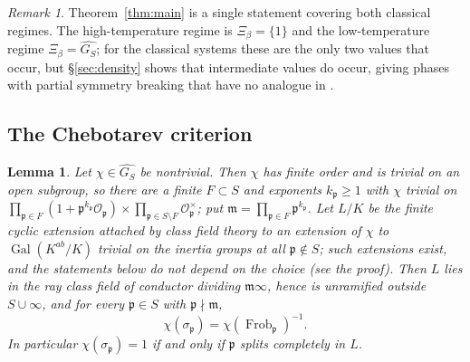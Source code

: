 \documentclass[11pt]{amsart}
\numberwithin{equation}{section}
\newtheorem{lemma}[theorem]{Lemma}
\theoremstyle{definition}
\theoremstyle{remark}
\newtheorem{remark}[theorem]{Remark}
\newcommand{\Gal}{\operatorname{Gal}}
\newcommand{\Frob}{\operatorname{Frob}}
\newcommand{\cO}{\mathcal{O}}
\newcommand{\pp}{\mathfrak{p}}
\newcommand{\mm}{\mathfrak{m}}
\begin{document}
\begin{remark}
Theorem~\ref{thm:main} is a single statement covering both classical regimes.
The high-temperature regime is $\Xi_\beta=\{1\}$ and the low-temperature regime
$\Xi_\beta=\widehat{G_S}$; for the classical systems these are the only two
values that occur, but \S\ref{sec:density} shows that intermediate values do
occur, giving phases with partial symmetry breaking that have no analogue in
\cite{BC,LLN}.
\end{remark}

\subsection{The Chebotarev criterion}

\begin{lemma}\label{lem:frob}
Let $\chi\in\widehat{G_S}$ be nontrivial. Then $\chi$ has finite order and is
trivial on an open subgroup, so there are a finite $F\subset S$ and exponents
$k_\pp\ge1$ with $\chi$ trivial on
$\prod_{\pp\in F}(1+\pp^{k_\pp}\cO_\pp)\times\prod_{\pp\in S\setminus F}\cO_\pp^\times$;
put $\mm=\prod_{\pp\in F}\pp^{k_\pp}$. Let $L/K$ be the finite cyclic extension
attached by class field theory to an extension of $\chi$ to $\Gal(K^{ab}/K)$ trivial on the
inertia groups at all $\pp\notin S$; such extensions exist, and the statements below do not
depend on the choice (see the proof). Then $L$ lies in the ray class field
of conductor dividing $\mm\infty$, hence is unramified outside $S\cup\infty$,
and for every $\pp\in S$ with $\pp\nmid\mm$,
\[
\chi(\sigma_\pp)=\chi(\Frob_\pp)^{-1}.
\]
In particular $\chi(\sigma_\pp)=1$ if and only if $\pp$ splits completely in
$L$.
\end{lemma}
\end{document}
